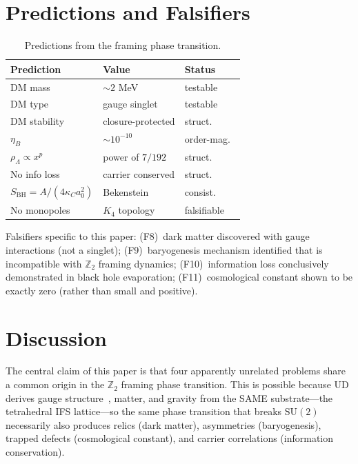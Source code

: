 \documentclass[11pt,twocolumn]{article}
\begin{document}
\section{Predictions and Falsifiers}
\label{sec:predictions}

\begin{table}[t]
\centering
\caption{Predictions from the framing phase transition.}
\label{tab:predictions2}
\small
\begin{tabular}{@{}l@{\hskip 5pt}l@{\hskip 5pt}l@{}}
\toprule
Prediction & Value & Status \\
\midrule
DM mass & $\sim 2$ MeV & testable \\
DM type & gauge singlet & testable \\
DM stability & closure-protected & struct.\ \\
$\eta_B$ & $\sim 10^{-10}$ & order-mag.\ \\
$\rho_\Lambda\propto x^p$ & power of $7/192$ & struct.\ \\
No info loss & carrier conserved & struct.\ \\
$S_{\mathrm{BH}}=A/(4\kappa_C a_0^2)$ & Bekenstein & consist.\ \\
No monopoles & $K_4$ topology & falsifiable \\
\bottomrule
\end{tabular}
\end{table}

Falsifiers specific to this paper:
(F8)~dark matter discovered with gauge interactions (not a singlet);
(F9)~baryogenesis mechanism identified that is incompatible with $\mathbb{Z}_2$ framing dynamics;
(F10)~information loss conclusively demonstrated in black hole evaporation;
(F11)~cosmological constant shown to be exactly zero (rather than small and positive).

\section{Discussion}
\label{sec:discussion}

The central claim of this paper is that four apparently unrelated problems share a common origin in the $\mathbb{Z}_2$ framing phase transition.
This is possible because UD derives gauge structure~\cite{wilson1974}, matter, and gravity from the SAME substrate---the tetrahedral IFS lattice---so the same phase transition that breaks $\mathrm{SU}(2)$ necessarily also produces relics (dark matter), asymmetries (baryogenesis), trapped defects (cosmological constant), and carrier correlations (information conservation).
\end{document}
